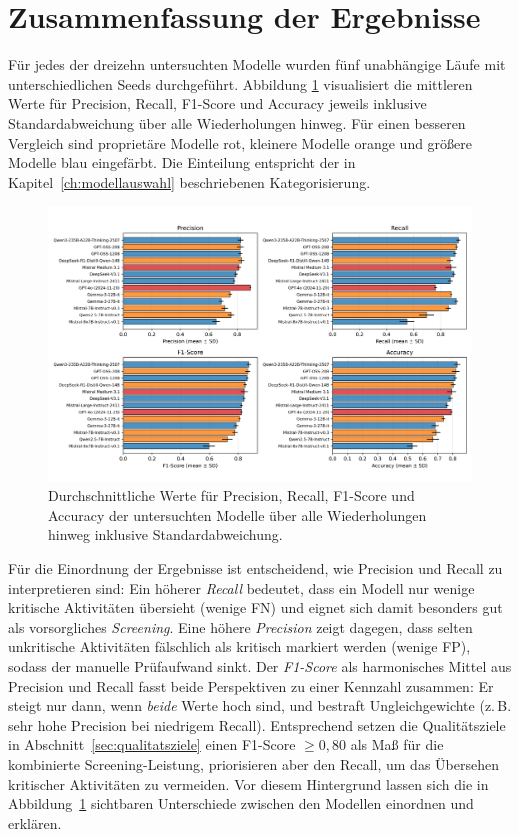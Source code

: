 \section{Zusammenfassung der Ergebnisse}\label{sec:ueberblick}

Für jedes der dreizehn untersuchten Modelle wurden fünf unabhängige Läufe mit unterschiedlichen Seeds durchgeführt. Abbildung \ref{fig:results-evaluation-metrics-comparison} visualisiert die mittleren Werte für Precision, Recall, F1-Score und Accuracy jeweils inklusive Standardabweichung über alle Wiederholungen hinweg. Für einen besseren Vergleich sind proprietäre Modelle rot, kleinere Modelle orange und größere Modelle blau eingefärbt. Die Einteilung entspricht der in Kapitel~\ref{ch:modellauswahl} beschriebenen Kategorisierung.

\begin{figure}[h]
    \centering
    \includegraphics[width=\textwidth]{images/results/evaluation_metrics_comparison_en}
    \caption{Durchschnittliche Werte für Precision, Recall, F1-Score und Accuracy der untersuchten Modelle über alle Wiederholungen hinweg inklusive Standardabweichung.}
    \label{fig:results-evaluation-metrics-comparison}
\end{figure}

Für die Einordnung der Ergebnisse ist entscheidend, wie Precision und Recall zu interpretieren sind: Ein höherer \emph{Recall} bedeutet, dass ein Modell nur wenige kritische Aktivitäten übersieht (wenige \ac{FN}) und eignet sich damit besonders gut als vorsorgliches \emph{Screening}. Eine höhere \emph{Precision} zeigt dagegen, dass selten unkritische Aktivitäten fälschlich als kritisch markiert werden (wenige \ac{FP}), sodass der manuelle Prüfaufwand sinkt. Der \emph{F1-Score} als harmonisches Mittel aus Precision und Recall fasst beide Perspektiven zu einer Kennzahl zusammen: Er steigt nur dann, wenn \emph{beide} Werte hoch sind, und bestraft Ungleichgewichte (z.\,B. sehr hohe Precision bei niedrigem Recall). Entsprechend setzen die Qualitätsziele in Abschnitt~\ref{sec:qualitatsziele} einen F1-Score $\geq 0{,}80$ als Maß für die kombinierte Screening-Leistung, priorisieren aber den Recall, um das Übersehen kritischer Aktivitäten zu vermeiden. Vor diesem Hintergrund lassen sich die in Abbildung~\ref{fig:results-evaluation-metrics-comparison} sichtbaren Unterschiede zwischen den Modellen einordnen und erklären.

